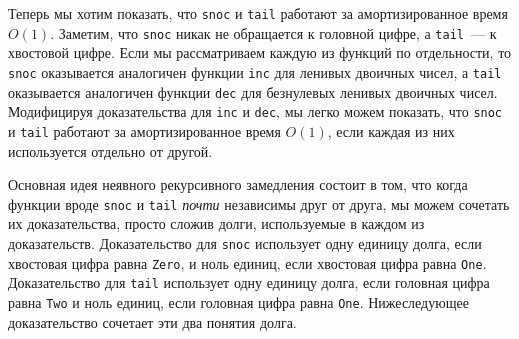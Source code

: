 Теперь мы хотим показать, что \lstinline!snoc! и \lstinline!tail!
работают за амортизированное время $O(1)$. Заметим, что
\lstinline!snoc! никак не обращается к головной цифре, а
\lstinline!tail!~--- к хвостовой цифре. Если мы рассматриваем каждую
из функций по отдельности, то \lstinline!snoc! оказывается аналогичен
функции \lstinline!inc! для ленивых двоичных чисел, а \lstinline!tail!
оказывается аналогичен функции \lstinline!dec! для безнулевых ленивых
двоичных чисел. Модифицируя доказательства для \lstinline!inc! и
\lstinline!dec!, мы легко можем показать, что \lstinline!snoc! и
\lstinline!tail! работают за амортизированное время $O(1)$, если
каждая из них используется отдельно от другой.

Основная идея неявного рекурсивного замедления состоит в том, что
когда функции вроде \lstinline!snoc! и \lstinline!tail! \emph{почти}
независимы друг от друга, мы можем сочетать их доказательства, просто
сложив долги, используемые в каждом из доказательств. Доказательство
для \lstinline!snoc! использует одну единицу долга, если хвостовая
цифра равна \lstinline!Zero!, и ноль единиц, если хвостовая цифра равна
\lstinline!One!. Доказательство для \lstinline!tail! использует одну
единицу долга, если головная цифра равна \lstinline!Two! и ноль
единиц, если головная цифра равна \lstinline!One!. Нижеследующее
доказательство сочетает эти два понятия долга.

